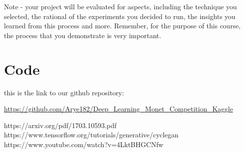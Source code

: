 \documentclass{article}
\begin{document}
Note - your project will be evaluated for aspects, including the technique you selected, the rational of the experiments you decided to run, the insights you learned from this process and more. Remember, for the purpose of this course, the process that you demonstrate is very  important.

\section{Code}
this is the link to our github repository:

\url{https://github.com/Arye182/Deep_Learning_Monet_Competition_Kaggle}



\begin{thebibliography}{100}
 https://arxiv.org/pdf/1703.10593.pdf
https://www.tensorflow.org/tutorials/generative/cyclegan
 https://www.youtube.com/watch?v=4LktBHGCNfw
\end{thebibliography}
\end{document}
